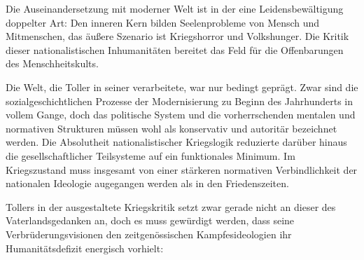 Die Auseinandersetzung mit moderner Welt ist in der  eine
Leidensbewältigung doppelter Art: Den inneren Kern bilden Seelenprobleme von
Mensch und Mitmenschen, das äußere Szenario ist Kriegshorror und
Volkshunger.  Die Kritik dieser nationalistischen Inhumanitäten
bereitet das Feld für die Offenbarungen des Menschheitskults.


Die Welt, die Toller in seiner  verarbeitete, war nur
bedingt \Cite{modern} geprägt. Zwar sind die sozialgeschichtlichen Prozesse
der Modernisierung zu Beginn des  Jahrhunderts in vollem Gange, doch das
politische System und die vorherrschenden mentalen und normativen Strukturen
müssen wohl als konservativ und autoritär bezeichnet werden.  Die Absolutheit
nationalistischer Kriegslogik reduzierte darüber hinaus die \Cite{Autonomie}
gesellschaftlicher Teilsysteme auf ein funktionales Minimum. Im Kriegszustand
muss insgesamt von einer stärkeren normativen Verbindlichkeit der nationalen
Ideologie augegangen werden als in den  
Friedenszeiten. 

Tollers in der  ausgestaltete Kriegskritik setzt zwar gerade
nicht an dieser \Cite{Antimodernität} des Vaterlandsgedanken an, doch es muss
gewürdigt werden, dass seine Verbrüderungsvisionen den zeitgenössischen
Kampfesideologien ihr Humanitätsdefizit energisch vorhielt:

